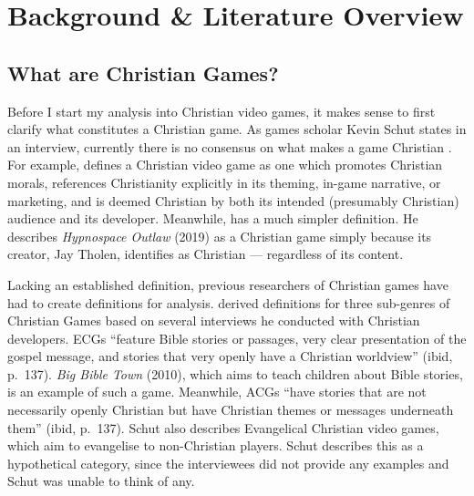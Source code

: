 \chapter{Background \& Literature Overview}


\section{What are Christian Games?}

Before I start my analysis into Christian video games, it makes sense to first clarify what constitutes a Christian game. As games scholar Kevin Schut states in an interview, currently there is no consensus on what makes a game Christian \parencite[8:38]{faith_forms_problem_2024}. For example, \textcite{moon_channel_why_2023} 
defines a Christian video game as one which promotes Christian morals, references Christianity explicitly in its theming, in-game narrative, or marketing, and is deemed Christian by both its intended (presumably Christian) audience and its developer. Meanwhile, \textcite{hartgrove_why_2022} has a much simpler definition. He describes \textit{Hypnospace Outlaw} (2019) as a Christian game simply because its creator, Jay Tholen, identifies as Christian --- regardless of its content.

Lacking an established definition, previous researchers of Christian games have had to create definitions for analysis. \textcite{schut_making_2013} derived definitions for three sub-genres of Christian Games based on several interviews he conducted with Christian developers. \acp{ECG} ``feature Bible stories or passages, very clear presentation of the gospel message, and stories that very openly have a Christian worldview'' (ibid, p.~137). \textit{Big Bible Town} (2010), which aims to teach children about Bible stories, is an example of such a game. Meanwhile, \acp{ACG} ``have stories that are not necessarily openly Christian but have Christian themes or messages underneath them'' (ibid, p.~137). Schut also describes Evangelical Christian video games, which aim to evangelise to non-Christian players. Schut describes this as a hypothetical category, since the interviewees did not provide any examples and Schut was unable to think of any.

